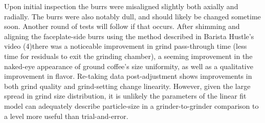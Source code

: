 \documentclass[10pt,a4paper,twocolumn,notitlepage]{article}
\begin{document}
Upon initial inspection the burrs were misaligned slightly both axially and radially. The burrs were also notably dull, and should likely be changed sometime soon. Another round of tests will follow if that occurs. After shimming and aligning the faceplate-side burrs using the method described in Barista Hustle's video (4)there was a noticeable improvement in grind pass-through time (less time for residuals to exit the grinding chamber), a seeming improvement in the naked-eye appearance of ground coffee's size uniformity, as well as a qualitative improvement in flavor. Re-taking data post-adjustment shows improvements in both grind quality and grind-setting change linearity. However, given the large spread in grind size distribution, it is unlikely the parameters of the linear fit model can adequately describe particle-size in a grinder-to-grinder comparison to a level more useful than trial-and-error.
\end{document}
